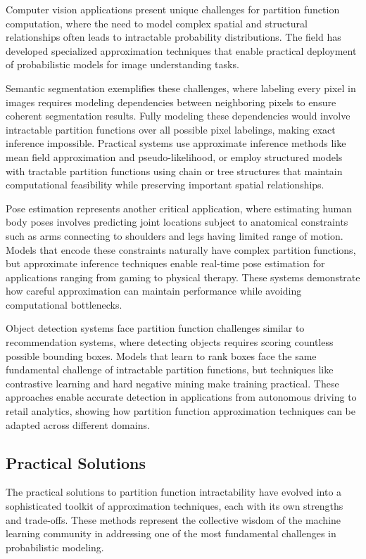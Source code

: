 Computer vision applications present unique challenges for partition function computation, where the need to model complex spatial and structural relationships often leads to intractable probability distributions. The field has developed specialized approximation techniques that enable practical deployment of probabilistic models for image understanding tasks.

Semantic segmentation exemplifies these challenges, where labeling every pixel in images requires modeling dependencies between neighboring pixels to ensure coherent segmentation results. Fully modeling these dependencies would involve intractable partition functions over all possible pixel labelings, making exact inference impossible. Practical systems use approximate inference methods like mean field approximation and pseudo-likelihood, or employ structured models with tractable partition functions using chain or tree structures that maintain computational feasibility while preserving important spatial relationships.

Pose estimation represents another critical application, where estimating human body poses involves predicting joint locations subject to anatomical constraints such as arms connecting to shoulders and legs having limited range of motion. Models that encode these constraints naturally have complex partition functions, but approximate inference techniques enable real-time pose estimation for applications ranging from gaming to physical therapy. These systems demonstrate how careful approximation can maintain performance while avoiding computational bottlenecks.

Object detection systems face partition function challenges similar to recommendation systems, where detecting objects requires scoring countless possible bounding boxes. Models that learn to rank boxes face the same fundamental challenge of intractable partition functions, but techniques like contrastive learning and hard negative mining make training practical. These approaches enable accurate detection in applications from autonomous driving to retail analytics, showing how partition function approximation techniques can be adapted across different domains.

\subsection{Practical Solutions}

The practical solutions to partition function intractability have evolved into a sophisticated toolkit of approximation techniques, each with its own strengths and trade-offs. These methods represent the collective wisdom of the machine learning community in addressing one of the most fundamental challenges in probabilistic modeling.

